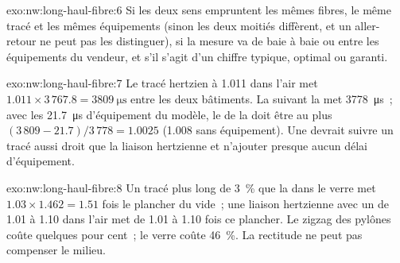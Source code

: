 \begin{solution}{exo:nw:long-haul-fibre:6}
Si les deux sens empruntent les mêmes fibres, le même tracé et les mêmes équipements (sinon les deux moitiés diffèrent, et un aller-retour ne peut pas les distinguer), si la
mesure va de baie à baie ou entre les équipements du vendeur, et s'il s'agit d'un chiffre typique, optimal ou garanti.
\end{solution}

\begin{solution}{exo:nw:long-haul-fibre:7}
Le tracé hertzien à 1.011 dans l'air met $1.011 \times 3\,767.8 = \qty{3809}{\micro\second}$ entre les deux bâtiments. La  suivant
la  met \qty{3778}{\micro\second}~; avec les \qty{21.7}{\micro\second} d'équipement du modèle, le  de la  doit être au plus
$(3\,809 - 21.7)/3\,778 = 1.0025$ (1.008 sans équipement). Une  devrait suivre un tracé aussi droit que la liaison hertzienne et
n'ajouter presque aucun délai d'équipement.
\end{solution}

\begin{solution}{exo:nw:long-haul-fibre:8}
Un tracé plus long de 3~\% que la  dans le verre met $1.03 \times 1.462 = 1.51$ fois le plancher du vide~; une liaison hertzienne avec un  de 1.01
à 1.10 dans l'air met de 1.01 à 1.10 fois ce plancher. Le zigzag des pylônes coûte quelques pour cent~; le verre coûte 46~\%. La rectitude ne peut pas
compenser le milieu.
\end{solution}

